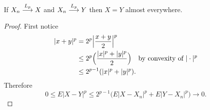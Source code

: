 \begin{theorem}
If $X_n\overset{\small L_p} \longrightarrow X$ and  $X_n\overset{\small L_p} \longrightarrow Y$ then  $X=Y$  almost everywhere.
\end{theorem}
\begin{proof}
First notice
\begin{align}
|x+y|^p &= 2^p \Bigl| \frac{x+y}{2} \Bigr|^p \nonumber \\
&\leq 2^p \Bigl(\frac{|x|^p + |y|^p}{2} \Bigr)\quad\text{by convexity of $|\cdot|^p$} \nonumber \\
& \leq 2^{p-1} (|x|^p + |y|^p). \label{convex ineq for normp}
\end{align}
Therefore
 \begin{equation}
 \label{convex ineq for normp 2}
 0\leq E|X-Y|^p\leq 2^{p-1}\bigl(E|X-X_n|^p + E|Y-X_n|^p\bigr)\rightarrow 0.
 \end{equation}

\end{proof}


